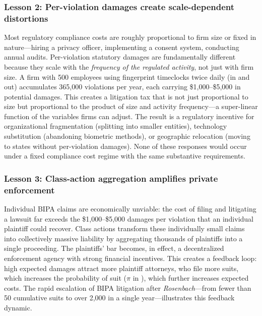 \documentclass[12pt]{article}
\begin{document}
\subsubsection*{Lesson 2: Per-violation damages create scale-dependent distortions} Most regulatory compliance costs are roughly proportional to firm size or fixed in nature---hiring a privacy officer, implementing a consent system, conducting annual audits. Per-violation statutory damages are fundamentally different because they scale with the \textit{frequency of the regulated activity}, not just with firm size. A firm with 500 employees using fingerprint timeclocks twice daily (in and out) accumulates 365,000 violations per year, each carrying \$1,000--\$5,000 in potential damages. This creates a litigation tax that is not just proportional to size but proportional to the product of size and activity frequency---a super-linear function of the variables firms can adjust. The result is a regulatory incentive for organizational fragmentation (splitting into smaller entities), technology substitution (abandoning biometric methods), or geographic relocation (moving to states without per-violation damages). None of these responses would occur under a fixed compliance cost regime with the same substantive requirements.

\subsubsection*{Lesson 3: Class-action aggregation amplifies private enforcement} Individual BIPA claims are economically unviable: the cost of filing and litigating a lawsuit far exceeds the \$1,000--\$5,000 damages per violation that an individual plaintiff could recover. Class actions transform these individually small claims into collectively massive liability by aggregating thousands of plaintiffs into a single proceeding. The plaintiffs' bar becomes, in effect, a decentralized enforcement agency with strong financial incentives. This creates a feedback loop: high expected damages attract more plaintiff attorneys, who file more suits, which increases the probability of suit ($\pi$ in ), which further increases expected costs. The rapid escalation of BIPA litigation after \textit{Rosenbach}---from fewer than 50 cumulative suits to over 2,000 in a single year---illustrates this feedback dynamic.
\end{document}
